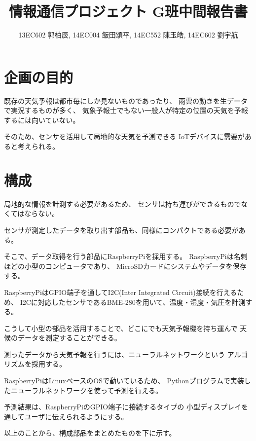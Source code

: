 \documentclass{jsarticle}
\title{情報通信プロジェクト G班中間報告書}
\author{13EC602 郭柏辰, 14EC004 飯田頌平, 14EC552 陳玉皓, 14EC602 劉宇航}
\begin{document}
  \maketitle
  
  
    \section{企画の目的}
    
      既存の天気予報は都市毎にしか見ないものであったり、
      雨雲の動きを生データで実況するものが多く、
      気象予報士でもない一般人が特定の位置の天気を予報するには向いていない。
      
      そのため、センサを活用して局地的な天気を予測できる
      IoTデバイスに需要があると考えられる。
    
    \section{構成}
    
      局地的な情報を計測する必要があるため、
      センサは持ち運びができるものでなくてはならない。
      
      センサが測定したデータを取り出す部品も、同様にコンパクトである必要がある。
      
      そこで、データ取得を行う部品にRaspberryPiを採用する。
      RaspberryPiは名刺ほどの小型のコンピュータであり、
      MicroSDカードにシステムやデータを保存する。
      
      RaspberryPiはGPIO端子を通してI2C(Inter Integrated Circuit)接続を行えるため、
      I2Cに対応したセンサであるBME-280を用いて、温度・湿度・気圧を計測する。
      
      こうして小型の部品を活用することで、どこにでも天気予報機を持ち運んで
      天候のデータを測定することができる。
      
      測ったデータから天気予報を行うには、ニューラルネットワーク\cite{Schmidhuber}という
      アルゴリズムを採用する。
      
      RaspberryPiはLinuxベースのOSで動いているため、
      Pythonプログラムで実装したニューラルネットワークを使って予測を行える。
      
      予測結果は、RaspberryPiのGPIO端子に接続するタイプの
      小型ディスプレイを通してユーザに伝えられるようにする。
    
      以上のことから、構成部品をまとめたものを下に示す。
    
\end{document}
